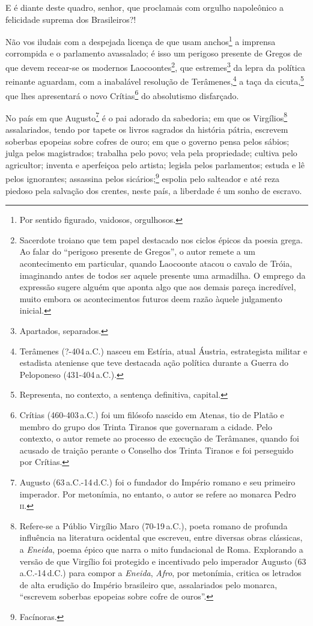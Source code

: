 E é diante deste quadro, senhor, que proclamais com orgulho napoleônico
a felicidade suprema dos Brasileiros?!

Não vos iludais com a despejada licença de que usam anchos\footnote{
  Por sentido figurado, vaidosos, orgulhosos.} a imprensa corrompida e o
parlamento avassalado; é isso um perigoso presente de Gregos de que
devem recear-se os modernos Laocoontes\footnote{Sacerdote troiano que
  tem papel destacado nos ciclos épicos da poesia grega. Ao falar do
  ``perigoso presente de Gregos'', o autor remete a um acontecimento em
  particular, quando Laocoonte atacou o cavalo de Tróia, imaginando
  antes de todos ser aquele presente uma armadilha. O emprego da
  expressão sugere alguém que aponta algo que aos demais pareça
  incredível, muito embora os acontecimentos futuros deem razão àquele
  julgamento inicial.}, que estremes\footnote{Apartados, separados.}
da lepra da política reinante aguardam, com a inabalável resolução de
Terâmenes,\footnote{Terâmenes (?-404\,a.C.) nasceu em Estíria, atual
  Áustria, estrategista militar e estadista ateniense que teve destacada
  ação política durante a Guerra do Peloponeso (431-404\,a.C.).} a
taça da cicuta,\footnote{Representa, no contexto, a sentença
  definitiva, capital.} que lhes apresentará o novo Crítias\footnote{
  Crítias (460-403\,a.C.) foi um filósofo nascido em Atenas, tio de
  Platão e membro do grupo dos Trinta Tiranos que governaram a cidade.
  Pelo contexto, o autor remete ao processo de execução de Terâmanes,
  quando foi acusado de traição perante o Conselho dos Trinta Tiranos e
  foi perseguido por Crítias.} do absolutismo disfarçado.

No país em que Augusto\footnote{Augusto (63\,a.C.-14\,d.C.) foi o fundador
  do Império romano e seu primeiro imperador. Por metonímia, no entanto,
  o autor se refere ao monarca Pedro \textsc{ii}.} é o pai adorado da sabedoria;
em que os Virgílios\footnote{Refere-se a Públio Virgílio Maro (70-19\,a.C.), 
poeta romano de profunda influência na literatura
  ocidental que escreveu, entre diversas obras clássicas, a
  \emph{Eneida}, poema épico que narra o mito fundacional de Roma.
  Explorando a versão de que Virgílio foi protegido e incentivado pelo
  imperador Augusto (63\,a.C.-14\,d.C.) para compor a \emph{Eneida},
  \emph{Afro}, por metonímia, critica os letrados de alta erudição do
  Império brasileiro que, assalariados pelo monarca, ``escrevem soberbas
  epopeias sobre cofre de ouros''.} assalariados, tendo por tapete os
livros sagrados da história pátria, escrevem soberbas epopeias sobre
cofres de ouro; em que o governo pensa pelos sábios; julga pelos
magistrados; trabalha pelo povo; vela pela propriedade; cultiva pelo
agricultor; inventa e aperfeiçoa pelo artista; legisla pelos
parlamentos; estuda e lê pelos ignorantes; assassina pelos
sicários;\footnote{Facínoras.} espolia pelo salteador e até reza
piedoso pela salvação dos crentes, neste país, a liberdade é um sonho de
escravo.

